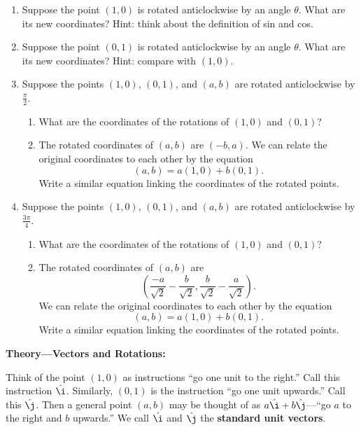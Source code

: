 \documentclass{article}
\def\ihat{\hat{\i}}
\def\jhat{\hat{\j}}
\begin{document}
\begin{enumerate}
\item Suppose the point $(1,0)$ is rotated anticlockwise by an angle $\theta$. What are its new coordinates? Hint: think about the definition of sin and cos.
\item Suppose the point $(0,1)$ is rotated anticlockwise by an angle $\theta$. What are its new coordinates? Hint: compare with $(1,0)$.
\item Suppose the points $(1,0)$, $(0,1)$, and $(a,b)$ are rotated anticlockwise by $\frac{\pi}{2}$.
	\begin{enumerate}
	\item What are the coordinates of the rotations of $(1,0)$ and $(0,1)$?
	\item The rotated coordinates of $(a,b)$ are $(-b,a)$.
	We can relate the original coordinates to each other by the equation
	\[ (a,b) = a(1,0) + b(0,1).\]
	Write a similar equation linking the coordinates of the rotated points.
	\end{enumerate}
\item Suppose the points $(1,0)$, $(0,1)$, and $(a,b)$ are rotated anticlockwise by $\frac{3\pi}{4}$.
	\begin{enumerate}
	\item What are the coordinates of the rotations of $(1,0)$ and $(0,1)$?
	\item The rotated coordinates of $(a,b)$ are
	\[\left(\frac{-a}{\sqrt{2}}-\frac{b}{\sqrt{2}},\frac{b}{\sqrt{2}}-\frac{a}{\sqrt{2}}\right).\]
	We can relate the original coordinates to each other by the equation
	\[ (a,b) = a(1,0) + b(0,1).\]
	Write a similar equation linking the coordinates of the rotated points.
	\end{enumerate}
\end{enumerate}




\clearpage

\textbf{Theory---Vectors and Rotations:}

\vspace{5mm}

Think of the point $(1,0)$ as instructions ``go one unit to the right.'' Call this instruction $\ihat$. Similarly, $(0,1)$ is the instruction ``go one unit upwards.'' Call this $\jhat$. Then a general point $(a,b)$ may be thought of as $a\ihat+b\jhat$---``go $a$ to the right and $b$ upwards.'' We call $\ihat$ and $\jhat$ the \textbf{standard unit vectors}.
\end{document}
